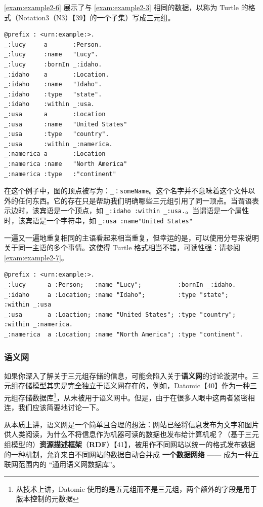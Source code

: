 \autoref{exam:example2-6} 展示了与 \autoref{exam:example2-3} 相同的数据，以称为 Turtle 的格式（Notation3（N3）【39】的一个子集）写成三元组。

\label{exam:example2-6}
\begin{lstlisting}[caption={图 2-5 中的数据子集，表示为 Turtle 三元组}]
@prefix : <urn:example:>.
_:lucy     a       :Person.
_:lucy     :name   "Lucy".
_:lucy     :bornIn _:idaho.
_:idaho    a       :Location.
_:idaho    :name   "Idaho".
_:idaho    :type   "state".
_:idaho    :within _:usa.
_:usa      a       :Location
_:usa      :name   "United States"
_:usa      :type   "country".
_:usa      :within _:namerica.
_:namerica a       :Location
_:namerica :name   "North America"
_:namerica :type   :"continent"
\end{lstlisting}

在这个例子中，图的顶点被写为：\texttt{\_：someName}。这个名字并不意味着这个文件以外的任何东西。它的存在只是帮助我们明确哪些三元组引用了同一顶点。当谓语表示边时，该宾语是一个顶点，如 \texttt{\_:idaho :within \_:usa.}。当谓语是一个属性时，该宾语是一个字符串，如 \texttt{\_:usa :name"United States"}

一遍又一遍地重复相同的主语看起来相当重复，但幸运的是，可以使用分号来说明关于同一主语的多个事情。这使得 Turtle 格式相当不错，可读性强：请参阅 \autoref{exam:example2-7}。

\label{exam:example2-7}
\begin{lstlisting}[caption={一种相对例 2-6 写入数据的更为简洁的方法。}]
@prefix : <urn:example:>.
_:lucy      a :Person;   :name "Lucy";          :bornIn _:idaho.
_:idaho     a :Location; :name "Idaho";         :type "state";   :within _:usa
_:usa       a :Loaction; :name "United States"; :type "country"; :within _:namerica.
_:namerica  a :Location; :name "North America"; :type "continent".
\end{lstlisting}

\subsubsection{语义网}

如果你深入了解关于三元组存储的信息，可能会陷入关于\textbf{语义网}的讨论漩涡中。三元组存储模型其实是完全独立于语义网存在的，例如，Datomic【40】作为一种三元组存储数据库\footnote{从技术上讲，Datomic 使用的是五元组而不是三元组，两个额外的字段是用于版本控制的元数据}，从未被用于语义网中。但是，由于在很多人眼中这两者紧密相连，我们应该简要地讨论一下。

从本质上讲，语义网是一个简单且合理的想法：网站已经将信息发布为文字和图片供人类阅读，为什么不将信息作为机器可读的数据也发布给计算机呢？（基于三元组模型的）\textbf{资源描述框架}（\textbf{RDF}）【41】，被用作不同网站以统一的格式发布数据的一种机制，允许来自不同网站的数据自动合并成 \textbf{一个数据网络} —— 成为一种互联网范围内的 “通用语义网数据库”。

